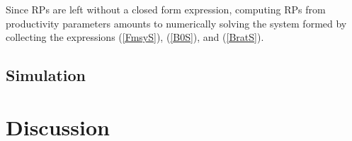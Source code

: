 %
Since RPs are left without a closed form expression, computing RPs from
productivity parameters amounts to numerically solving the system formed by collecting the
expressions (\ref{FmsyS}), (\ref{B0S}), and (\ref{BratS}).

%
\subsection{Simulation \label{sSim}}

%
\section{Discussion}


